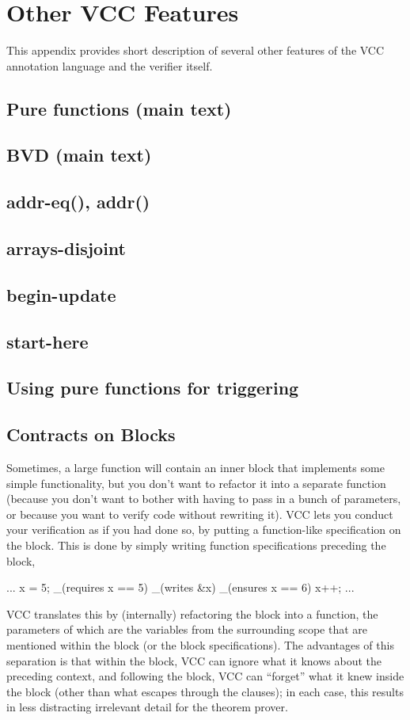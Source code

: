 \section{Other VCC Features}

This appendix provides short description of several other
features of the VCC annotation language and the verifier itself.

\subsection{Pure functions (main text)}
\subsection{BVD (main text)}
\subsection{addr-eq(), addr()}
\subsection{arrays-disjoint}
\subsection{begin-update}
\subsection{start-here}
\subsection{Using pure functions for triggering}

\subsection{Contracts on Blocks} 

Sometimes, a large function will contain an inner block that
implements some simple functionality, but you don't want to refactor
it into a separate function (\eg because you don't want to bother with
having to pass in a bunch of parameters, or because you want to verify
code without rewriting it). VCC lets you conduct your verification as
if you had done so, by putting a function-like specification on the
block.
This is done by simply writing function specifications
preceding the block, \eg
\begin{VCC}
...
x = 5;
_(requires x == 5)
_(writes &x)
_(ensures x == 6)
{
  x++;
}
...
\end{VCC}
VCC translates this by (internally) refactoring the block into a
function, the parameters of which are the variables from the
surrounding scope that are mentioned within the block (or the block
specifications). The advantages of this separation is that within the block,
VCC can ignore what it knows about the preceding context, and
following the block, VCC can ``forget'' what it knew inside the block
(other than what escapes through the  clauses); in each
case, this results in less distracting irrelevant detail for the
theorem prover.

